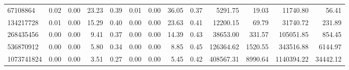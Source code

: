\begin{tabular}{lrrrrrrrrrrrr}
67108864   &        0.02 &        0.00 &         23.23 &          0.39 &           0.01 &           0.00 &        36.05 &         0.37 &          5291.75 &            19.03 &        11740.80 &           56.41 \\
134217728  &        0.01 &        0.00 &         15.29 &          0.40 &           0.00 &           0.00 &        23.63 &         0.41 &         12200.15 &            69.79 &        31740.72 &          231.89 \\
268435456  &        0.00 &        0.00 &          9.41 &          0.37 &           0.00 &           0.00 &        14.39 &         0.43 &         38653.00 &           331.57 &       105051.85 &          854.45 \\
536870912  &        0.00 &        0.00 &          5.80 &          0.34 &           0.00 &           0.00 &         8.85 &         0.45 &        126364.62 &          1520.55 &       343516.88 &         6144.97 \\
1073741824 &        0.00 &        0.00 &          3.51 &          0.27 &           0.00 &           0.00 &         5.45 &         0.42 &        408567.31 &          8990.64 &      1140394.22 &        34442.12 \\
\bottomrule
\end{tabular}
